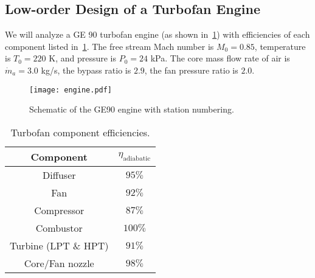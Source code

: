 \documentclass[11pt]{article}
\begin{document}
\subsection*{Low-order Design of a Turbofan Engine} %
\label{sub:low_order_design_of_a_turbofan_engine}
\noindent We will analyze a GE 90 turbofan engine (as shown in~\cref{fig:engine}) with efficiencies of each component listed in~\cref{tab:eff}. The free stream Mach number is $M_0 = 0.85$, temperature is $T_0 = 220$ K, and pressure is $P_0 = 24$ kPa. The core mass flow rate of air is $\dot{m}_a = 3.0$ kg/s, the bypass ratio is $2.9$, the fan pressure ratio is $2.0$.

\begin{figure}[ht]
	\centering
	\texttt{[image: engine.pdf]}
    \caption{Schematic of the GE90 engine with station numbering.}
	\label{fig:engine}
\end{figure}

\begin{table}[ht!]
	\caption{Turbofan component efficiencies.}
	\label{tab:eff}
	\centering
	\begin{tabular}{ | c | c |} 
			\hline
 		   	Component & $\eta_\text{adiabatic}$ \\ 
			\hline
			Diffuser & $95\%$ \\ 
			\hline
			Fan & $92\%$ \\
			\hline
			Compressor & $87\%$ \\
			\hline
			Combustor & $100\%$ \\
			\hline
			Turbine (LPT \& HPT) & $91\%$ \\
			\hline
			Core/Fan nozzle & $98\%$ \\
			\hline
	\end{tabular}
\end{table}
\end{document}
